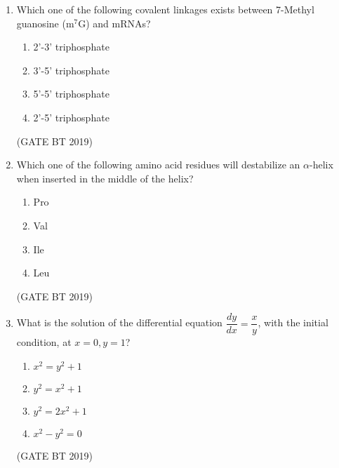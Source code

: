 \documentclass[journal,12pt,onecolumn]{IEEEtran}
\begin{document}
\begin{enumerate}
S. It maintains pH at 7.4

\begin{multicols}{4}
\begin{enumerate}
\item P and Q only
\item P and S only
\item P, Q and R only
\item P, Q, R and S
\end{enumerate}
\end{multicols}\hfill(GATE BT 2019)



\item Which one of the following covalent linkages exists between 7-Methyl guanosine (m$^7$G) and mRNAs?

\begin{multicols}{2}
\begin{enumerate}
\item 2'-3' triphosphate
\item 3'-5' triphosphate
\item 5'-5' triphosphate
\item 2'-5' triphosphate
\end{enumerate}
\end{multicols}\hfill(GATE BT 2019)

\item Which one of the following amino acid residues will destabilize an $\alpha$-helix when inserted in the middle of the helix?

\begin{multicols}{4}
\begin{enumerate}
\item Pro
\item Val
\item Ile
\item Leu
\end{enumerate}
\end{multicols}\hfill(GATE BT 2019)

\item What is the solution of the differential equation $\dfrac{dy}{dx} = \dfrac{x}{y}$, with the initial condition, at $x = 0, y = 1$?

\begin{multicols}{4}
\begin{enumerate}
\item $x^2 = y^2 + 1$
\item $y^2 = x^2 + 1$
\item $y^2 = 2x^2 + 1$
\item $x^2 - y^2 = 0$
\end{enumerate}
\end{multicols}\hfill(GATE BT 2019)


\end{enumerate}
\end{document}
